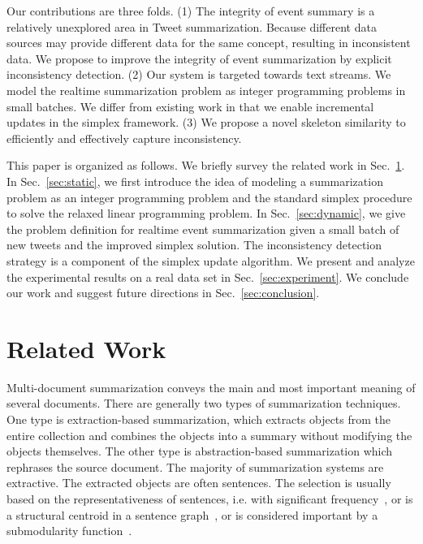 \documentclass[runningheads]{llncs}
\begin{document}
Our contributions are three folds. (1) The integrity of event summary is a relatively unexplored area in Tweet summarization. Because different data sources may provide different data for the same concept, resulting in inconsistent data. We propose to improve the integrity of event summarization by explicit inconsistency detection. (2) Our system is targeted towards text streams. We model the realtime summarization problem as integer programming problems in small batches. We differ from existing work in that we enable incremental updates in the simplex framework. (3) We propose a novel skeleton similarity to efficiently and effectively capture inconsistency.

This paper is organized as follows. We briefly survey the related work in Sec.~\ref{sec:related}. In Sec.~\ref{sec:static}, we first introduce the idea of modeling a summarization problem as an integer programming problem and the standard simplex procedure to solve the relaxed linear programming problem. In Sec.~\ref{sec:dynamic}, we give the problem definition for realtime event summarization given a small batch of new tweets and the improved simplex solution. The inconsistency detection strategy is a component of the simplex update algorithm. We present and analyze the experimental results on a real data set in Sec.~\ref{sec:experiment}. We conclude our work and suggest future directions in Sec.~\ref{sec:conclusion}.

\section{Related Work}\label{sec:related}

Multi-document summarization conveys the main and most important meaning of several documents. There are generally two types of summarization techniques. One type is extraction-based summarization, which extracts objects from the entire collection and combines the objects into a summary without modifying the objects themselves. The other type is abstraction-based summarization which rephrases the source document. The majority of summarization systems are extractive. The extracted objects are often sentences. The selection is usually based on the representativeness of sentences, i.e. with significant frequency~\cite{Yih2007Multi-document}, or is a structural centroid in a sentence graph~\cite{Lin2012Generating}, or is considered important by a submodularity function~\cite{MSSF}.
\end{document}
